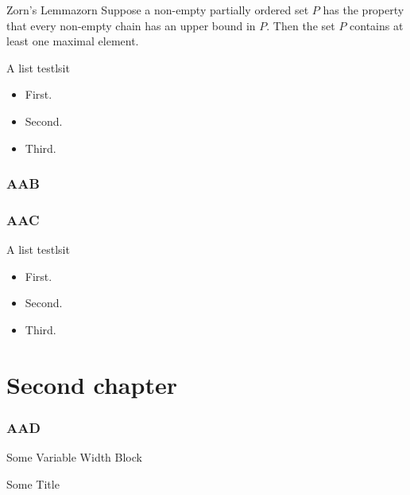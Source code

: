 \documentclass[2m,twoside]{libro-matua}
\begin{document}
\begin{lema}{Zorn's Lemma}{zorn}
Suppose a non-empty partially ordered set $P$ has the property that every non-empty chain has an upper bound in $P$. Then the set $P$ contains at least one maximal element.
\end{lema}
\begin{lema}{A list test}{lsit}
\begin{itemize}
\item First.
\item Second.
\item Third.
\end{itemize}
\end{lema}

\subsection{AAB}
\lipsum
\subsection{AAC}
\lipsum[4-5]
\begin{lema}{A list test}{lsit}
\begin{itemize}
\item First.
\item Second.
\item Third.
\end{itemize}
\lipsum[1-3]
\end{lema}

\chapter{Second chapter}
\PartialToc
\subsection{AAD}
\begin{MyBlock}{Some Variable Width Block}
\lipsum[4]
\end{MyBlock}

\begin{MyBlock}[.5\linewidth]{Some Title}
\lipsum[4]
\end{MyBlock}
\lipsum
\end{document}
